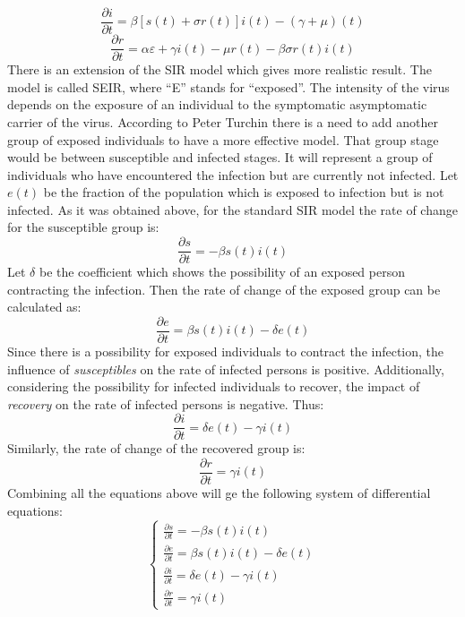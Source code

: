 \begin{equation*}
    \frac{\partial i}{\partial t} = \beta[s(t) + \sigma r(t)]i(t) - (\gamma + \mu)(t)
\end{equation*}
\begin{equation*}
    \frac{\partial r}{\partial t} = \alpha \varepsilon + \gamma i(t) - \mu r(t) - \beta \sigma r(t)i(t)
\end{equation*}
\hspace{\parindent}There is an extension of the SIR model which gives more realistic result.
The model is called SEIR, where ``E'' stands for ``exposed''.
The intensity of the virus depends on the exposure of an individual to the symptomatic asymptomatic carrier of the virus.
According to Peter Turchin \cite{Peter_Turchin} there is a need to add another group of exposed individuals to have a more effective model.
That group stage would be between susceptible and infected stages.
It will represent a group of individuals who have encountered the infection but are currently not infected.
Let $e(t)$ be the fraction of the population which is exposed to infection but is not infected.
As it was obtained above, for the standard SIR model the rate of change for the susceptible group is:
\begin{equation*}
    \frac{\partial s}{\partial t} = -\beta s(t)  i(t)
\end{equation*}
Let $\delta$ be the coefficient which shows the possibility of an exposed person contracting the infection.
Then the rate of change of the exposed group can be calculated as:
\begin{equation*}
    \frac{\partial e}{\partial t} = \beta s(t)  i(t) - \delta e(t)
\end{equation*}
Since there is a possibility for exposed individuals to contract the infection, the influence of \textit{susceptibles} on the rate of infected persons is positive.
Additionally, considering the possibility for infected individuals to recover, the impact of \textit{recovery} on the rate of infected persons is negative.
Thus:
\begin{equation*}
    \frac{\partial i}{\partial t} = \delta e(t) - \gamma i(t)
\end{equation*}
Similarly, the rate of change of the recovered group is:
\begin{equation*}
    \frac{\partial r}{\partial t} = \gamma i(t)
\end{equation*}
Combining all the equations above will ge the following system of differential equations:
\[
\left\{
    \begin{array}{l}
        \frac{\partial s}{\partial t} = -\beta s(t)  i(t)\\
        \frac{\partial e}{\partial t} = \beta s(t)  i(t) - \delta e(t)\\
        \frac{\partial i}{\partial t} = \delta e(t) - \gamma i(t)\\
        \frac{\partial r}{\partial t} = \gamma i(t)
    \end{array}
\right.
\]
